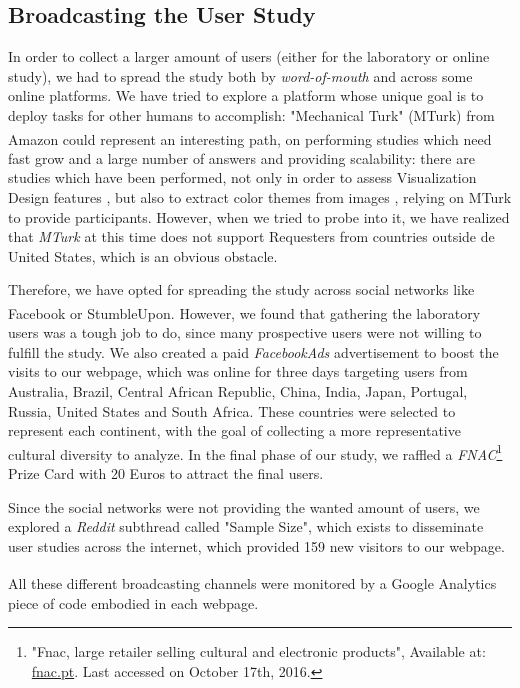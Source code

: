 \subsection{Broadcasting the User Study}
\label{sec:results_divulgation}
%
In order to collect a larger amount of users (either for the laboratory or online study), we had to spread the study both by \emph{word-of-mouth} and
across some online platforms. We have tried to explore a platform whose unique goal is to deploy tasks for other humans to accomplish: "Mechanical Turk"
(MTurk) from Amazon\textsuperscript{\textregistered} could represent an interesting path, on performing studies which need fast grow and a large number
of answers and providing scalability: there are studies which have been performed, not only in order to assess Visualization Design features
\cite{Heer2010}, but also to extract color themes from images \cite{Lin2013}, relying on MTurk to provide participants. However, when we tried to probe
into it, we have realized that \emph{MTurk} at this time does not support Requesters from countries outside de United States, which is an obvious obstacle. \par
%
Therefore, we have opted for spreading the study across social networks like Facebook\textsuperscript{\textregistered} or StumbleUpon. However, we found
that gathering the laboratory users was a tough job to do, since many prospective users were not willing to fulfill the study. We also created a paid \emph{FacebookAds}
advertisement to boost the visits to our webpage, which was online for three days targeting users from Australia, Brazil, Central African Republic, China,
India, Japan, Portugal, Russia, United States and South Africa. These countries were selected to represent each continent, with the goal of collecting a
more representative cultural diversity to analyze. In the final phase of our study, we raffled a \emph{FNAC}\footnote{"Fnac, large retailer selling cultural and electronic
products", Available at: \url{fnac.pt}. Last accessed on October 17th, 2016.} Prize Card with 20 Euros to attract the final users. \par
%
Since the social networks were not providing the wanted amount of users, we explored a \emph{Reddit} subthread called "Sample Size", which exists to disseminate
user studies across the internet, which provided 159 new visitors to our webpage. \par
%
All these different broadcasting channels were monitored by a Google\textsuperscript{\textregistered} Analytics piece of code embodied in each webpage.
%
